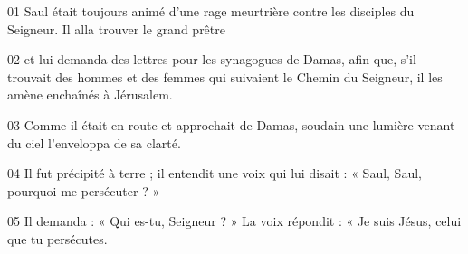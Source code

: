 01 Saul était toujours animé d’une rage meurtrière contre les disciples du Seigneur. Il alla trouver le grand prêtre

02 et lui demanda des lettres pour les synagogues de Damas, afin que, s’il trouvait des hommes et des femmes qui suivaient le Chemin du Seigneur, il les amène enchaînés à Jérusalem.

03 Comme il était en route et approchait de Damas, soudain une lumière venant du ciel l’enveloppa de sa clarté.

04 Il fut précipité à terre ; il entendit une voix qui lui disait : « Saul, Saul, pourquoi me persécuter ? »

05 Il demanda : « Qui es-tu, Seigneur ? » La voix répondit : « Je suis Jésus, celui que tu persécutes.
